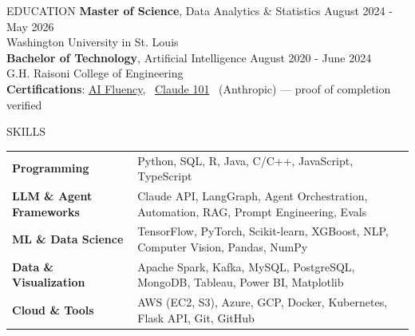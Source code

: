 \documentclass{resume}
\begin{document}
\fontsize{9.5}{10.0}\selectfont   %
\vspace{-0.7em}

\begin{rSection}{\large EDUCATION}
\vspace{-0.8em}
{\bf Master of Science}, Data Analytics \& Statistics \hfill {August 2024 - May 2026}\\
Washington University in St. Louis\\[0.35em]
{\bf Bachelor of Technology}, Artificial Intelligence \hfill {August 2020 - June 2024}\\
G.H. Raisoni College of Engineering\\[0.35em]
{\bf Certifications}: \href{https://verify.skilljar.com/c/yp7j38kd9euw}{AI Fluency}, \ \href{https://verify.skilljar.com/c/dz4rus7u6q7t}{Claude 101} \ (Anthropic) --- proof of completion verified
\vspace{-0.7em}
\end{rSection}

\begin{rSection}{\large SKILLS}
\vspace{-0.95em}
\begin{tabular}{ @{} >{\bfseries}l @{\hspace{3ex}} l }
Programming & Python, SQL, R, Java, C/C++, JavaScript, TypeScript \\[0.2em]
LLM \& Agent Frameworks & Claude API, LangGraph, Agent Orchestration, Automation, RAG, Prompt Engineering, Evals \\[0.2em]
ML \& Data Science & TensorFlow, PyTorch, Scikit-learn, XGBoost, NLP, Computer Vision, Pandas, NumPy \\[0.2em]
Data \& Visualization & Apache Spark, Kafka, MySQL, PostgreSQL, MongoDB, Tableau, Power BI, Matplotlib \\[0.2em]
Cloud \& Tools & AWS (EC2, S3), Azure, GCP, Docker, Kubernetes, Flask API, Git, GitHub \\
\end{tabular}
\vspace{-0.8em}
\end{rSection}
\end{document}
